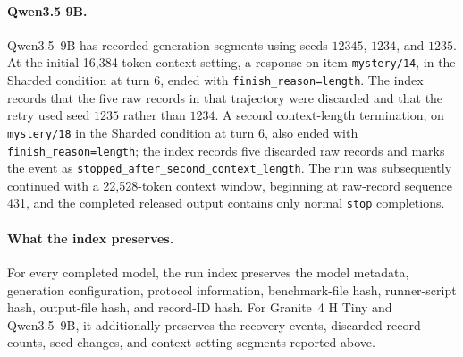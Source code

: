 \paragraph{Qwen3.5 9B.} Qwen3.5~9B has recorded generation segments using seeds $12345$, $1234$, and $1235$. At the initial 16{,}384-token context setting, a response on item \texttt{mystery/14}, in the Sharded condition at turn 6, ended with \texttt{finish\_reason=length}. The index records that the five raw records in that trajectory were discarded and that the retry used seed $1235$ rather than $1234$. A second context-length termination, on \texttt{mystery/18} in the Sharded condition at turn 6, also ended with \texttt{finish\_reason=length}; the index records five discarded raw records and marks the event as \texttt{stopped\_after\_second\_context\_length}. The run was subsequently continued with a 22{,}528-token context window, beginning at raw-record sequence 431, and the completed released output contains only normal \texttt{stop} completions.

\paragraph{What the index preserves.} For every completed model, the run index preserves the model metadata, generation configuration, protocol information, benchmark-file hash, runner-script hash, output-file hash, and record-ID hash. For Granite~4 H Tiny and Qwen3.5~9B, it additionally preserves the recovery events, discarded-record counts, seed changes, and context-setting segments reported above.
